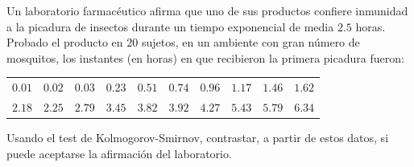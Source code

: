 \begin{ejercicio}
    Un laboratorio farmacéutico afirma que uno de sus productos confiere inmunidad a la picadura de insectos durante un tiempo exponencial de media $2.5$ horas. Probado el producto en 20 sujetos, en un ambiente con gran número de mosquitos, los instantes (en horas) en que recibieron la primera picadura fueron:
    \begin{table}[H]
    \centering
    \begin{tabular}{cccccccccc}
        $0.01$ & $0.02$ & $0.03$ & $0.23$ & $0.51$ & $0.74$ & $0.96$ & $1.17$ & $1.46$ & $1.62$ \\
        $2.18$ & $2.25$ & $2.79$ & $3.45$ & $3.82$ & $3.92$ & $4.27$ & $5.43$ & $5.79$ & $6.34$
    \end{tabular}
    \end{table}
    \noindent
    Usando el test de Kolmogorov-Smirnov, contrastar, a partir de estos datos, si puede aceptarse la afirmación del laboratorio.\\


\end{ejercicio}
